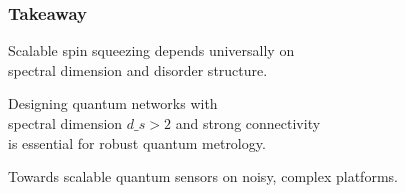 \documentclass{beamer}
\begin{document}
\begin{frame}
\frametitle{\bfseries Takeaway}

\vfill
\centering
\Huge \alert{Scalable spin squeezing depends universally on \\ spectral dimension and disorder structure.}

\vspace{0.5cm}
\large
\centering
\alert{Designing quantum networks with} \\
\alert{spectral dimension \(d\_s > 2\) and strong connectivity} \\
\alert{is essential for robust quantum metrology.}

\vfill
\centering
{\normalsize Towards \alert{scalable quantum sensors} on noisy, complex platforms.}

\vfill
\end{frame}
\end{document}
